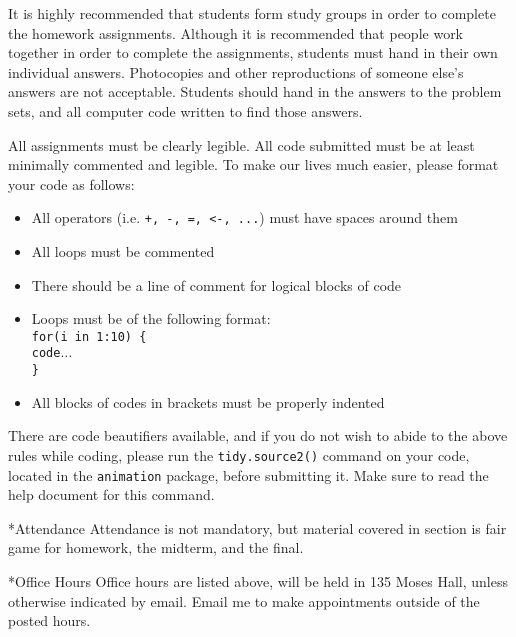 \documentclass[fleqn,11pt]{article}
\makeatletter
\renewcommand{\subsection}{\@startsection{subsection}{0}{0em}{\baselineskip}{0.5\baselineskip}{\normalfont\bfseries\normalsize}}
\makeatother
\begin{document}
It is highly
recommended that students form study groups in order to complete the
homework assignments.  Although it is recommended that people work
together in order to complete the assignments, students must hand in
their own individual answers.  Photocopies and other reproductions of
someone else's answers are not acceptable.  Students should hand in
the answers to the problem sets, and all computer code written to find
those answers.

All assignments must be clearly legible.  All code submitted must be at least minimally commented and legible.  To make our lives much easier, please format your code as follows:


\begin{itemize}
\item All operators (i.e. \texttt{+, -, =, <-, ...}) must have spaces around them
\item All loops must be commented
\item There should be a line of comment for logical blocks of code
\item Loops must be of the following format:\\
\texttt{for(i in 1:10) \{ \\
\hspace*{1cm}code$\ldots$\\
\}}
\item All blocks of codes in brackets must be properly indented
\end{itemize}

There are code beautifiers available, and if you do not wish to abide to the above rules while coding, please run the \texttt{tidy.source2()} command on your code, located in the \texttt{animation} package, before submitting it.  Make sure to read the help document for this command.

\subsection*{Attendance}
Attendance is not mandatory, but material covered in section is fair game for homework, the midterm, and the final.

\subsection*{Office Hours}
Office hours are listed above, will be held in 135 Moses Hall, unless
otherwise indicated by email. Email me to make
appointments outside of the posted hours.
\end{document}
